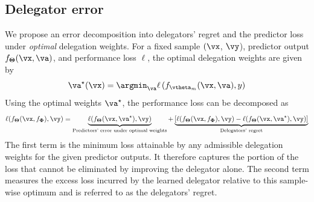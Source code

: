 \documentclass[10pt]{article} %
\def\vTheta{{\bm{\Theta}}}
\def\vPhi{{\bm{\Phi}}}
\begin{document}



\subsection{Delegator error}

We propose an error decomposition into delegators' regret and the predictor loss under \textit{optimal} delegation weights. For a fixed sample $(\vx$, $\vy$), predictor output $f_{\vTheta}(\vx,\va)$, and performance loss $\ell$, the optimal delegation weights are given by
\begin{equation}
    \va^{\star}(\vx) = \argmin_{\va}  \ell \left(f_{\vtheta_m}(\vx, \va) , y\right)
\end{equation}
Using the optimal weights $\va^{\star}$, the performance loss can be decomposed as
 \begin{equation} \label{eq:delegator-decomposition}
    \ell(f_{\vTheta} (\vx, f_{\vPhi}), \vy) = 
    \underbrace{
        \ell(f_{\vTheta} (\vx, \va^{\star}), \vy)
    }
    _{\text{Predictors' error under optimal weights}} + 
    \underbrace{
    \left[ 
        \ell(f_{\vTheta} (\vx, f_{\vPhi}), \vy) - 
        \ell(f_{\vTheta} (\vx, \va^{\star}), \vy)
    \right]
    }_{\text{Delegators' regret}}
 \end{equation}
The first term is the minimum loss attainable by any admissible delegation weights for the given predictor outputs. It therefore captures the portion of the loss that cannot be eliminated by improving the delegator alone. The second term measures the excess loss incurred by the learned delegator relative to this sample-wise optimum and is referred to as the delegators' regret.
\end{document}
